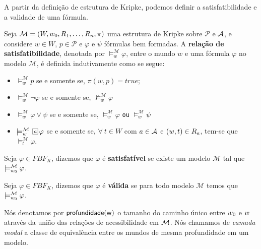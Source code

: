 A partir da definição de estrutura de Kripke, podemos definir a satisfatibilidade
e a validade de uma fórmula.
\begin{definition}
    Seja $\mathcal{M} = (W, w_0, R_1, \ldots, R_n, \pi)$ uma estrutura de Kripke sobre
    $\mathcal{P}$ e ${\cal{A}}$, e considere $w \in W$, $p \in \mathcal{P}$
    e $\varphi$ e $\psi$ fórmulas bem formadas. A \textbf{relação de
    satisfatibilidade}, denotada por $\models ^{\mathcal{M}}_{w} \varphi$, entre
    o mundo $w$ e uma fórmula $\varphi$ no modelo $\mathcal{M}$, é definida
    indutivamente como se segue:
    \begin{itemize}
        \item $\models ^{\mathcal{M}}_{w} p$ se e somente se, $\pi(w,p) =
            true$;
        \item $\models ^{\mathcal{M}}_{w} \neg \varphi$ se e somente se,
            $\not\models ^{\mathcal{M}}_{w} \varphi$
            
        \item $\models ^{\mathcal{M}}_{w} \varphi \vee \psi$ se e somente se,
            $\models ^{\mathcal{M}}_{w} \varphi$ \texttt{ou} $\models
            ^{\mathcal{M}}_{w} \psi$
        \item $\models ^{\mathcal{M}}_{w} \nec{\agent} \varphi$ se e somente se,
            $\forall~t \in W$ com $a \in {\cal{A}}$  e $(w,t) \in R_{a}$,
            tem-se que $\models ^{\mathcal{M}}_{t} \varphi$. 
    \end{itemize}
\end{definition}

\begin{definition}
    Seja $\varphi \in FBF_{K}$, dizemos que $\varphi$ é
    \textbf{satisfatível} se existe um modelo $\mathcal{M}$ tal que $\models ^{\mathcal{M}}_{w_0} \varphi$.  
\end{definition}

\begin{definition}
    Seja $\varphi \in FBF_{K}$, dizemos que $\varphi$ é
    \textbf{válida} se para todo modelo $\mathcal{M}$ temos que $\models ^{\mathcal{M}}_{w_0} \varphi$.  
\end{definition}

Nós denotamos por $\sf profundidade(w)$ o tamanho do caminho único entre $w_0$ e  $w$
através da união das relações de acessibilidade em ${\cal M}$. 
Nós chamamos de \emph{camada modal} a classe de equivalência entre os mundos de
mesma profundidade em um modelo.

